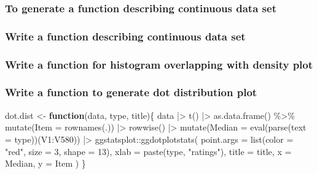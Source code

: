 \documentclass[
]{article}
\newenvironment{Shaded}{\begin{snugshade}}{\end{snugshade}}
\newcommand{\AttributeTok}[1]{\textcolor[rgb]{0.77,0.63,0.00}{#1}}
\newcommand{\ControlFlowTok}[1]{\textcolor[rgb]{0.13,0.29,0.53}{\textbf{#1}}}
\newcommand{\DecValTok}[1]{\textcolor[rgb]{0.00,0.00,0.81}{#1}}
\newcommand{\FunctionTok}[1]{\textcolor[rgb]{0.00,0.00,0.00}{#1}}
\newcommand{\NormalTok}[1]{#1}
\newcommand{\OtherTok}[1]{\textcolor[rgb]{0.56,0.35,0.01}{#1}}
\newcommand{\SpecialCharTok}[1]{\textcolor[rgb]{0.00,0.00,0.00}{#1}}
\newcommand{\StringTok}[1]{\textcolor[rgb]{0.31,0.60,0.02}{#1}}
\begin{document}
\hypertarget{to-generate-a-function-describing-continuous-data-set}{%
\subsubsection{To generate a function describing continuous data set}\label{to-generate-a-function-describing-continuous-data-set}}

\hypertarget{write-a-function-describing-continuous-data-set}{%
\subsubsection{Write a function describing continuous data set}\label{write-a-function-describing-continuous-data-set}}

\hypertarget{write-a-function-for-histogram-overlapping-with-density-plot}{%
\subsubsection{Write a function for histogram overlapping with density plot}\label{write-a-function-for-histogram-overlapping-with-density-plot}}

\hypertarget{write-a-function-to-generate-dot-distribution-plot}{%
\subsubsection{Write a function to generate dot distribution plot}\label{write-a-function-to-generate-dot-distribution-plot}}

\begin{Shaded}
\begin{Highlighting}[]
\NormalTok{dot.dist }\OtherTok{\textless{}{-}} 
  \ControlFlowTok{function}\NormalTok{(data, type, title)\{}
\NormalTok{    data }\SpecialCharTok{|\textgreater{}}
      \FunctionTok{t}\NormalTok{() }\SpecialCharTok{|\textgreater{}} 
      \FunctionTok{as.data.frame}\NormalTok{() }\SpecialCharTok{\%\textgreater{}\%} 
      \FunctionTok{mutate}\NormalTok{(}\AttributeTok{Item =} \FunctionTok{rownames}\NormalTok{(.)) }\SpecialCharTok{|\textgreater{}} 
      \FunctionTok{rowwise}\NormalTok{() }\SpecialCharTok{|\textgreater{}} 
      \FunctionTok{mutate}\NormalTok{(}\AttributeTok{Median =} \FunctionTok{eval}\NormalTok{(}\FunctionTok{parse}\NormalTok{(}\AttributeTok{text =}\NormalTok{ type))(V1}\SpecialCharTok{:}\NormalTok{V580)) }\SpecialCharTok{|\textgreater{}} 
\NormalTok{      ggstatsplot}\SpecialCharTok{::}\FunctionTok{ggdotplotstats}\NormalTok{(}
        \AttributeTok{point.args =} \FunctionTok{list}\NormalTok{(}\AttributeTok{color =} \StringTok{"red"}\NormalTok{, }\AttributeTok{size =} \DecValTok{3}\NormalTok{, }\AttributeTok{shape =} \DecValTok{13}\NormalTok{),}
        \AttributeTok{xlab =} \FunctionTok{paste}\NormalTok{(type, }\StringTok{"ratings"}\NormalTok{),}
        \AttributeTok{title =}\NormalTok{ title,}
        \AttributeTok{x =}\NormalTok{ Median,}
        \AttributeTok{y =}\NormalTok{ Item}
\NormalTok{      )}
\NormalTok{    \}}
\end{Highlighting}
\end{Shaded}
\end{document}
